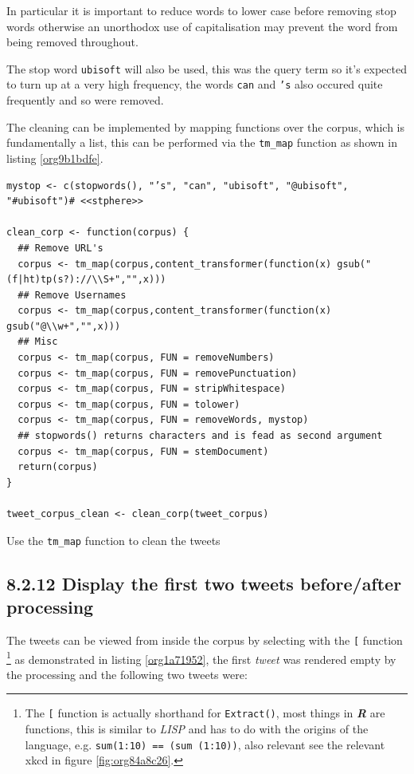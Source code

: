 \documentclass[11pt]{article}
\begin{document}
In particular it is important to reduce words to lower case before removing stop words otherwise an unorthodox use of capitalisation may prevent the word from being removed throughout.

The stop word \texttt{ubisoft} will also be used, this was the query term so it's expected to turn up at a very high frequency, the words \texttt{can} and \texttt{'s} also occured quite frequently and so were removed.

The cleaning can be implemented by mapping functions over the corpus, which is fundamentally a list, this can be performed via the \texttt{tm\_map} function as shown in listing \ref{org9b1bdfe}.



\begin{listing}[htbp]
\begin{verbatim}
mystop <- c(stopwords(), "’s", "can", "ubisoft", "@ubisoft", "#ubisoft")# <<stphere>>

clean_corp <- function(corpus) {
  ## Remove URL's
  corpus <- tm_map(corpus,content_transformer(function(x) gsub("(f|ht)tp(s?)://\\S+","",x)))
  ## Remove Usernames
  corpus <- tm_map(corpus,content_transformer(function(x) gsub("@\\w+","",x)))
  ## Misc
  corpus <- tm_map(corpus, FUN = removeNumbers)
  corpus <- tm_map(corpus, FUN = removePunctuation)
  corpus <- tm_map(corpus, FUN = stripWhitespace)
  corpus <- tm_map(corpus, FUN = tolower)
  corpus <- tm_map(corpus, FUN = removeWords, mystop)
  ## stopwords() returns characters and is fead as second argument
  corpus <- tm_map(corpus, FUN = stemDocument)
  return(corpus)
}

tweet_corpus_clean <- clean_corp(tweet_corpus)
\end{verbatim}
\caption{\label{org9b1bdfe}Use the \texttt{tm\_map} function to clean the tweets}
\end{listing}

\subsection{8.2.12 Display the first two tweets before/after processing}
\label{sec:org71c2569}
The tweets can be viewed from inside the corpus by selecting with the \texttt{[} function \footnote{The \texttt{[} function is actually shorthand for \texttt{Extract()}, most things in
\textbf{\emph{R}} are functions, this is similar to \emph{LISP} and has to do with the origins of
the language, e.g. \texttt{sum(1:10) == (sum (1:10))}, also relevant see the relevant
xkcd in figure \ref{fig:org84a8c26}.} as demonstrated in listing \ref{org1a71952}, the first \emph{tweet} was rendered empty by the processing and the following two tweets were:
\end{document}
